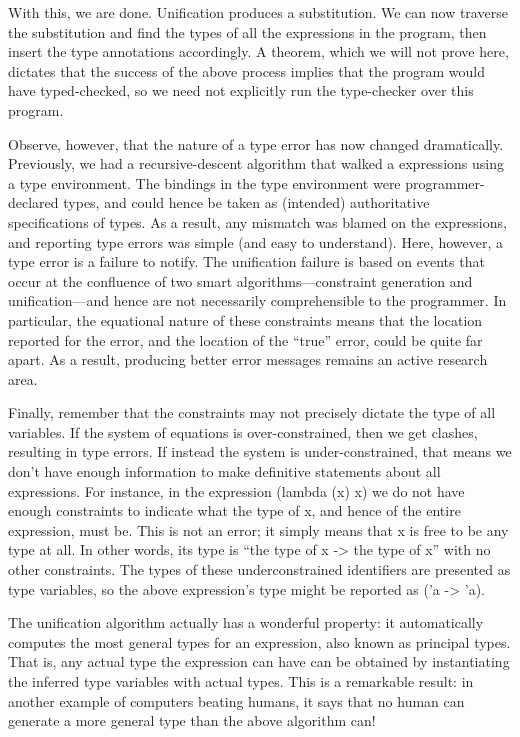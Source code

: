 With this, we are done. Unification produces a substitution. We can now traverse
the substitution and find the types of all the expressions in the program, then
insert the type annotations accordingly. A theorem, which we will not prove
here, dictates that the success of the above process implies that the program
would have typed-checked, so we need not explicitly run the type-checker over
this program.

Observe, however, that the nature of a type error has now changed dramatically.
Previously, we had a recursive-descent algorithm that walked a expressions using
a type environment. The bindings in the type environment were
programmer-declared types, and could hence be taken as (intended) authoritative
specifications of types. As a result, any mismatch was blamed on the
expressions, and reporting type errors was simple (and easy to understand).
Here, however, a type error is a failure to notify. The unification failure is
based on events that occur at the confluence of two smart algorithms—constraint
generation and unification—and hence are not necessarily comprehensible to the
programmer. In particular, the equational nature of these constraints means that
the location reported for the error, and the location of the “true” error, could
be quite far apart. As a result, producing better error messages remains an
active research area.

Finally, remember that the constraints may not precisely dictate the type of all
variables. If the system of equations is over-constrained, then we get clashes,
resulting in type errors. If instead the system is under-constrained, that means
we don’t have enough information to make definitive statements about all
expressions. For instance, in the expression (lambda (x) x) we do not have
enough constraints to indicate what the type of x, and hence of the entire
expression, must be. This is not an error; it simply means that x is free to be
any type at all. In other words, its type is “the type of x -> the type of x”
with no other constraints. The types of these underconstrained identifiers are
presented as type variables, so the above expression’s type might be reported as
('a -> 'a).

The unification algorithm actually has a wonderful property: it automatically
computes the most general types for an expression, also known as principal
types. That is, any actual type the expression can have can be obtained by
instantiating the inferred type variables with actual types. This is a
remarkable result: in another example of computers beating humans, it says that
no human can generate a more general type than the above algorithm can!

